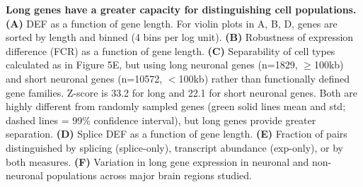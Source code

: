 \textbf{Long genes have a greater capacity for distinguishing cell populations. (A)} DEF as a function of gene length. For violin plots in A, B, D, genes are sorted by length and binned (4 bins per log unit). \textbf{(B)} Robustness of expression difference (FCR) as a function of gene length. \textbf{(C)} Separability of cell types calculated as in Figure 5E, but using long neuronal genes (n=1829, $\geq$100kb) and short neuronal genes (n=10572, $<$100kb) rather than functionally defined gene families. Z-score is 33.2 for long and 22.1 for short neuronal genes. Both are highly different from randomly sampled genes (green solid lines mean and std; dashed lines = 99\% confidence interval), but long genes provide greater separation. \textbf{(D)} Splice DEF as a function of gene length. \textbf{(E)} Fraction of pairs distinguished by splicing (splice-only), transcript abundance (exp-only), or by both measures. \textbf{(F)} Variation in long gene expression in neuronal and non-neuronal populations across major brain regions studied.  